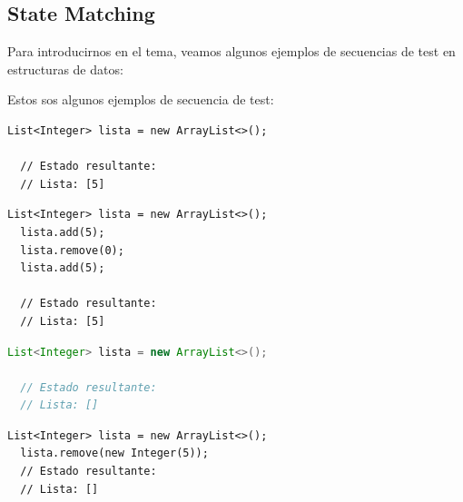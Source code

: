 \subsection{State Matching}
\label{sec:stateMatching}

Para introducirnos en el tema, veamos algunos ejemplos de secuencias de test en estructuras de datos:

Estos sos algunos ejemplos de secuencia de test: 

\bigskip
\begin{lstlisting}[numbers=none, caption={Crear una lista vacía}, label={lst:emptylist}, captionpos=b, frame=tb, basicstyle=\scriptsize]
  List<Integer> lista = new ArrayList<>();

  // Estado resultante:
  // Lista: [5]
\end{lstlisting}

\vspace{1em}

\begin{lstlisting}[numbers=none, caption={Crear una lista vacía, agregar y eliminar un elemento, luego agregarlo nuevamente}, label={lst:add-remove-add}, captionpos=b, frame=tb, basicstyle=\scriptsize]
  List<Integer> lista = new ArrayList<>();
  lista.add(5);
  lista.remove(0);
  lista.add(5);

  // Estado resultante:
  // Lista: [5]
\end{lstlisting}
  
\vspace{1em}

\begin{lstlisting}[language=Java, caption={Crear una lista vacía}, label={lst:remove-empty}, captionpos=b, frame=tb, basicstyle=\scriptsize]
  List<Integer> lista = new ArrayList<>();
  
  // Estado resultante:
  // Lista: []
\end{lstlisting}

\vspace{1em}
 
\begin{lstlisting}[numbers=none, caption={Intentar eliminar un elemento en una lista vacía}, label={lst:remove-empty}, captionpos=b, frame=tb, basicstyle=\scriptsize]
  List<Integer> lista = new ArrayList<>();
  lista.remove(new Integer(5)); 
  // Estado resultante:
  // Lista: []
\end{lstlisting}
  
\vspace{1em}

